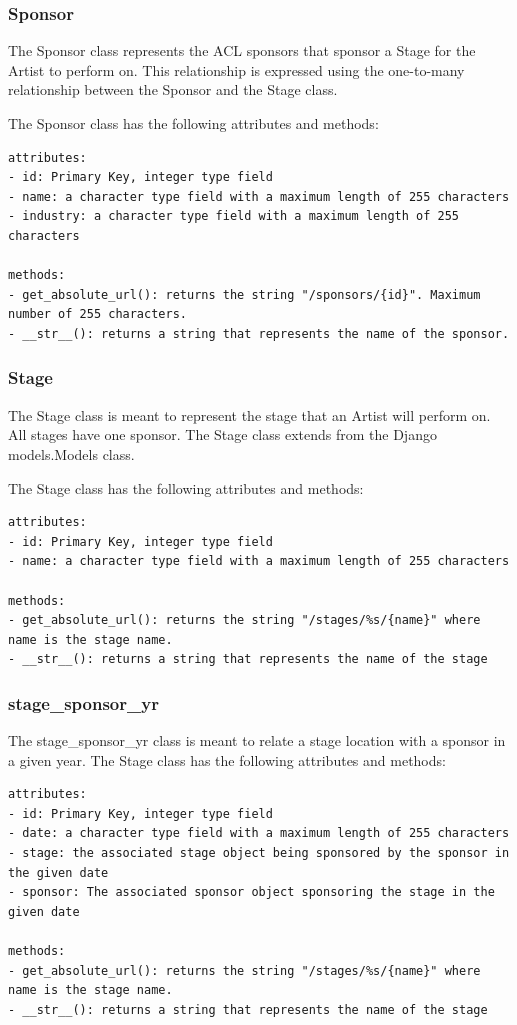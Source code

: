 \documentclass[12pt,english]{scrartcl}
\begin{document}
\subsubsection{Sponsor}
The Sponsor class represents the ACL sponsors that sponsor a Stage for the Artist to perform on.
This relationship is expressed using the one-to-many relationship between the Sponsor and the Stage
class. 

The Sponsor class has the following attributes and methods:
\begin{verbatim}
attributes:
- id: Primary Key, integer type field
- name: a character type field with a maximum length of 255 characters
- industry: a character type field with a maximum length of 255 characters

methods:
- get_absolute_url(): returns the string "/sponsors/{id}". Maximum number of 255 characters.
- __str__(): returns a string that represents the name of the sponsor.
\end{verbatim}

\subsubsection{Stage}
The Stage class is meant to represent the stage that an Artist will perform on. All stages
have one sponsor. The Stage class extends from the Django models.Models class.

The Stage class has the following attributes and methods:
\begin{verbatim}
attributes:
- id: Primary Key, integer type field
- name: a character type field with a maximum length of 255 characters

methods:
- get_absolute_url(): returns the string "/stages/%s/{name}" where name is the stage name.
- __str__(): returns a string that represents the name of the stage
\end{verbatim}

\subsubsection{stage\_sponsor\_yr}

The stage\_sponsor\_yr class is meant to relate a stage location with a sponsor in a given year.
The Stage class has the following attributes and methods:
\begin{verbatim}
attributes:
- id: Primary Key, integer type field
- date: a character type field with a maximum length of 255 characters
- stage: the associated stage object being sponsored by the sponsor in the given date
- sponsor: The associated sponsor object sponsoring the stage in the given date

methods:
- get_absolute_url(): returns the string "/stages/%s/{name}" where name is the stage name.
- __str__(): returns a string that represents the name of the stage
\end{verbatim}
\end{document}
